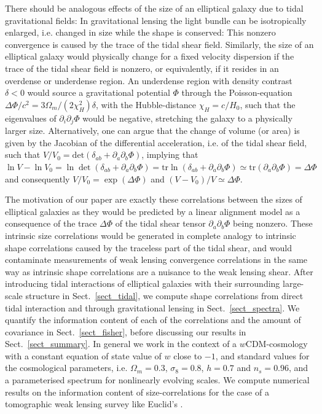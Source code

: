 \documentclass[a4paper,fleqn,usenatbib]{mnras}
\begin{document}
There should be analogous effects of the size of an elliptical galaxy due to tidal gravitational fields: In gravitational lensing the light bundle can be isotropically enlarged, i.e. changed in size while the shape is conserved: This nonzero convergence is caused by the trace of the tidal shear field. Similarly, the size of an elliptical galaxy would physically change for a fixed velocity dispersion if the trace of the tidal shear field is nonzero, or equivalently, if it resides in an overdense or underdense region. An underdense region with density contrast $\delta < 0$ would source a gravitational potential $\Phi$ through the Poisson-equation $\Delta\Phi/c^2 = 3\Omega_m/(2\chi_H^2)\delta$, with the Hubble-distance $\chi_H = c/H_0$, such that the eigenvalues of $\partial_i\partial_j\Phi$ would be negative, stretching the galaxy to a physically larger size. Alternatively, one can argue that the change of volume (or area) is given by the Jacobian of the differential acceleration, i.e. of the tidal shear field, such that $V/V_0 = \mathrm{det}(\delta_{ab} + \partial_a\partial_b\Phi)$, implying that $\ln V-\ln V_0 = \ln\det(\delta_{ab} + \partial_a\partial_b\Phi) = \mathrm{tr}\ln(\delta_{ab} + \partial_a\partial_b\Phi) \simeq \mathrm{tr}(\partial_a\partial_b\Phi) = \Delta\Phi$ and consequently $V/V_0 = \exp(\Delta\Phi)$ and $(V-V_0)/V \simeq\Delta\Phi$.

The motivation of our paper are exactly these correlations between the sizes of elliptical galaxies as they would be predicted by a linear alignment model as a consequence of the trace $\Delta\Phi$ of the tidal shear tensor $\partial_a\partial_b\Phi$ being nonzero. These intrinsic size correlations would be generated in complete analogy to intrinsic shape correlations caused by the traceless part of the tidal shear, and would contaminate measurements of weak lensing convergence correlations \citep{alsing_weak_2014} in the same way as intrinsic shape correlations are a nuisance to the weak lensing shear. After introducing tidal interactions of elliptical galaxies with their surrounding large-scale structure in Sect.~\ref{sect_tidal}, we compute shape correlations from direct tidal interaction and through gravitational lensing in Sect.~\ref{sect_spectra}. We quantify the information content of each of the correlations and the amount of covariance in Sect.~\ref{sect_fisher}, before discussing our results in Sect.~\ref{sect_summary}. In general we work in the context of a $w$CDM-cosmology with a constant equation of state value of $w$ close to $-1$, and standard values for the cosmological parameters, i.e. $\Omega_m = 0.3$, $\sigma_8 =  0.8$, $h = 0.7$ and $n_s = 0.96$, and a parameterised spectrum for nonlinearly evolving scales. We compute numerical results on the information content of size-correlations for the case of a tomographic weak lensing survey like Euclid's \citep{Amendola:2016saw}.
\end{document}
